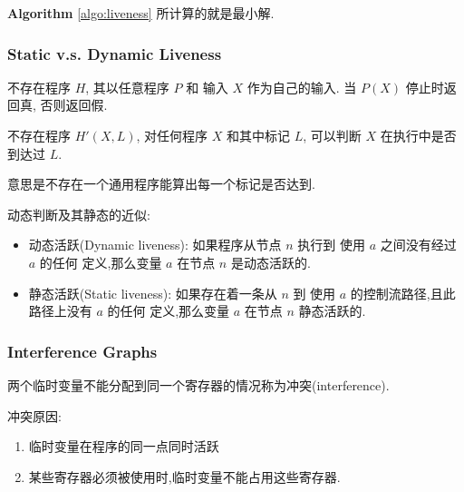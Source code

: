 \textbf{Algorithm} \ref{algo:liveness} 所计算的就是最小解. 

\subsubsection{Static v.s. Dynamic Liveness}
\begin{theorem}
    不存在程序 $H$, 其以任意程序 $P$ 和 输入 $X$ 作为自己的输入. 当 $P(X)$ 停止时返回真, 否则返回假. 
\end{theorem}

\begin{corollary}
    不存在程序 $H'(X, L)$, 对任何程序 $X$ 和其中标记 $L$, 可以判断 $X$ 在执行中是否到达过 $L$.
\end{corollary}
意思是不存在一个通用程序能算出每一个标记是否达到. 


动态判断及其静态的近似:
\begin{itemize}
    \item 动态活跃(Dynamic liveness): 如果程序从节点 $n$ 执行到 使用 $a$ 之间没有经过 $a$ 的任何 定义,那么变量 $a$ 在节点 $n$ 是动态活跃的.
    \item 静态活跃(Static liveness): 如果存在着一条从 $n$ 到 使用 $a$ 的控制流路径,且此路径上没有 $a$ 的任何 定义,那么变量 $a$ 在节点 $n$ 静态活跃的.
\end{itemize}

\subsubsection{Interference Graphs}
\begin{definition}
    两个临时变量不能分配到同一个寄存器的情况称为冲突(interference).
\end{definition}

冲突原因:
\begin{enumerate}
    \item 临时变量在程序的同一点同时活跃
    \item 某些寄存器必须被使用时,临时变量不能占用这些寄存器.
\end{enumerate}

